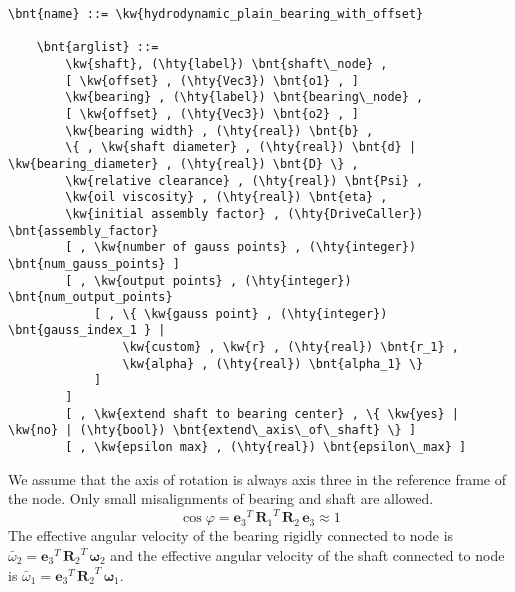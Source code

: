 \begin{Verbatim}[commandchars=\\\{\}]
    \bnt{name} ::= \kw{hydrodynamic_plain_bearing_with_offset}

    \bnt{arglist} ::=
        \kw{shaft}, (\hty{label}) \bnt{shaft\_node} ,
        [ \kw{offset} , (\hty{Vec3}) \bnt{o1} , ]
        \kw{bearing} , (\hty{label}) \bnt{bearing\_node} ,
        [ \kw{offset} , (\hty{Vec3}) \bnt{o2} , ]
        \kw{bearing width} , (\hty{real}) \bnt{b} ,
        \{ , \kw{shaft diameter} , (\hty{real}) \bnt{d} | \kw{bearing_diameter} , (\hty{real}) \bnt{D} \} ,
        \kw{relative clearance} , (\hty{real}) \bnt{Psi} ,
        \kw{oil viscosity} , (\hty{real}) \bnt{eta} ,
        \kw{initial assembly factor} , (\hty{DriveCaller}) \bnt{assembly_factor}
        [ , \kw{number of gauss points} , (\hty{integer}) \bnt{num_gauss_points} ]
        [ , \kw{output points} , (\hty{integer}) \bnt{num_output_points} 
            [ , \{ \kw{gauss point} , (\hty{integer}) \bnt{gauss_index_1 } |
                \kw{custom} , \kw{r} , (\hty{real}) \bnt{r_1} , 
                \kw{alpha} , (\hty{real}) \bnt{alpha_1} \}
            ]
        ]
        [ , \kw{extend shaft to bearing center} , \{ \kw{yes} | \kw{no} | (\hty{bool}) \bnt{extend\_axis\_of\_shaft} \} ]
        [ , \kw{epsilon max} , (\hty{real}) \bnt{epsilon\_max} ]
\end{Verbatim}
We assume that the axis of rotation is always axis three in the reference frame of the node. Only small misalignments of bearing and shaft are allowed.
\begin{equation}
\cos{\varphi}={\boldsymbol{e}_{3}}^T \, {\boldsymbol{R}_1}^T \, \boldsymbol{R}_2 \, \boldsymbol{e}_{3} \approx 1
\end{equation}
The effective angular velocity of the bearing rigidly connected to node  is $\bar{\omega}_2={\boldsymbol{e}_{3}}^T\,{\boldsymbol{R}_{2}}^T\,\boldsymbol{\omega}_2$ and the effective angular velocity of the shaft connected to node  is $\bar{\omega}_1={\boldsymbol{e}_{3}}^T\,{\boldsymbol{R}_{2}}^T\,\boldsymbol{\omega}_1$.
